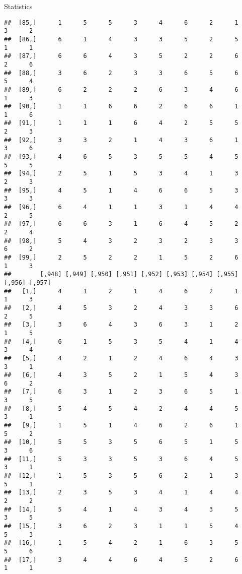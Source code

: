 \documentclass[
  ignorenonframetext,
]{beamer}
\begin{document}
\begin{frame}[fragile]{Statistics}
\begin{verbatim}
##  [85,]      1      5      5      3      4      6      2      1      3      2
##  [86,]      6      1      4      3      3      5      2      5      1      1
##  [87,]      6      6      4      3      5      2      2      6      2      6
##  [88,]      3      6      2      3      3      6      5      6      5      4
##  [89,]      6      2      2      2      6      3      4      6      1      3
##  [90,]      1      1      6      6      2      6      6      1      1      6
##  [91,]      1      1      1      6      4      2      5      5      2      3
##  [92,]      3      3      2      1      4      3      6      1      3      6
##  [93,]      4      6      5      3      5      5      4      5      5      5
##  [94,]      2      5      1      5      3      4      1      3      2      3
##  [95,]      4      5      1      4      6      6      5      3      3      3
##  [96,]      6      4      1      1      3      1      4      4      2      5
##  [97,]      6      6      3      1      6      4      5      2      2      4
##  [98,]      5      4      3      2      3      2      3      3      6      2
##  [99,]      2      5      2      2      1      5      2      6      1      3
##        [,948] [,949] [,950] [,951] [,952] [,953] [,954] [,955] [,956] [,957]
##   [1,]      4      1      2      1      4      6      2      1      1      3
##   [2,]      4      5      3      2      4      3      3      6      2      5
##   [3,]      3      6      4      3      6      3      1      2      1      5
##   [4,]      6      1      5      3      5      4      1      4      3      4
##   [5,]      4      2      1      2      4      6      4      3      3      1
##   [6,]      4      3      5      2      1      5      4      3      6      2
##   [7,]      6      3      1      2      3      6      5      1      3      5
##   [8,]      5      4      5      4      2      4      4      5      3      1
##   [9,]      1      5      1      4      6      2      6      1      5      2
##  [10,]      5      5      3      5      6      5      1      5      3      6
##  [11,]      5      3      3      5      3      6      4      5      3      1
##  [12,]      1      5      3      5      6      2      1      3      5      1
##  [13,]      2      3      5      3      4      1      4      4      2      2
##  [14,]      5      4      1      4      3      4      3      5      3      5
##  [15,]      3      6      2      3      1      1      5      4      5      3
##  [16,]      1      5      4      2      1      6      3      5      5      6
##  [17,]      3      4      4      6      4      5      2      6      1      1

\end{verbatim}
\end{frame}
\end{document}
